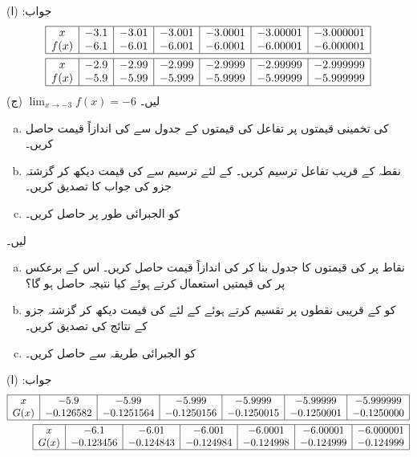 جواب: (ا) 
\begin{align*}
\begin{array}{|c|c|c|c|c|c|c|}
\hline
x&-3.1&-3.01&-3.001&-3.0001&-3.00001&-3.000001\\
f(x)&-6.1&-6.01&-6.001&-6.0001&-6.00001&-6.000001\\
\hline
\end{array}\\
\begin{array}{|c|c|c|c|c|c|c|}
\hline
x&-2.9&-2.99&-2.999&-2.9999&-2.99999&-2.999999\\
f(x)&-5.9&-5.99&-5.999&-5.9999&-5.99999&-5.999999\\
\hline
\end{array}
\end{align*}
(ج) 
$\lim_{x\to -3} f(x)=-6$ 
 لیں۔
\begin{enumerate}[a.]
\item
{} کی تخمینی قیمتوں  پر تفاعل کی قیمتوں کے جدول سے   کی اندازاً قیمت حاصل کریں۔
\item
نقطہ  کے قریب تفاعل ترسیم کریں۔ کے لئے ترسیم سے  کی قیمت دیکھ کر گزشتہ جزو کی جواب کا تصدیق کریں۔
\item
{} کو الجبرائی طور پر حاصل کریں۔
\end{enumerate}
 لیں۔
\begin{enumerate}[a.]
\item
نقاط  پر  کی قیمتوں کا جدول بنا کر  کی اندازاً قیمت حاصل کریں۔ اس کے برعکس  پر  کی قیمتیں استعمال کرتے ہوئے کیا نتیجہ حاصل ہو گا؟
\item
{} کو  کے قریبی نقطوں پر تقسیم کرتے ہوئے  کے لئے  کی قیمت دیکھ کر گزشتہ جزو کے نتائج کی تصدیق کریں۔
\item
{} کو الجبرائی طریقہ سے حاصل کریں۔
\end{enumerate}
جواب: (ا)
\begin{align*}
\begin{array}{|c|c|c|c|c|c|c|}
\hline
x&-5.9&-5.99&-5.999&-5.9999&-5.99999&-5.999999\\
G(x)&-0.126582&-0.1251564&-0.1250156&-0.1250015&-0.1250001&-0.1250000\\
\hline
\end{array}\\
\begin{array}{|c|c|c|c|c|c|c|}
\hline
x&-6.1&-6.01&-6.001&-6.0001&-6.00001&-6.000001\\
G(x)&-0.123456&-0.124843&-0.124984&-0.124998&-0.124999&-0.124999\\
\hline
\end{array}
\end{align*}
